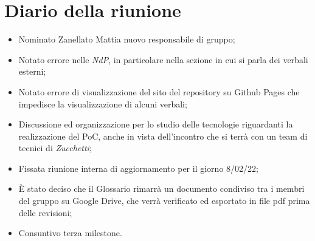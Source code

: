 \section{Diario della riunione}
\begin{itemize}
  \item Nominato Zanellato Mattia nuovo responsabile di gruppo;
  \item Notato errore nelle \textit{NdP}, in particolare nella sezione in cui si parla dei verbali esterni;
  \item Notato errore di visualizzazione del sito del repository su Github Pages che impedisce la visualizzazione di alcuni verbali;
  \item Discussione ed organizzazione per lo studio delle tecnologie riguardanti la realizzazione del PoC, anche in vista dell'incontro che si terrà con un team di tecnici di \textit{Zucchetti};
  \item Fissata riunione interna di aggiornamento per il giorno 8/02/22;
  \item \`E stato deciso che il Glossario rimarrà un documento condiviso tra i membri del gruppo su Google Drive, che verrà verificato ed esportato in file pdf prima delle revisioni;
  \item Consuntivo terza milestone.
\end{itemize}
